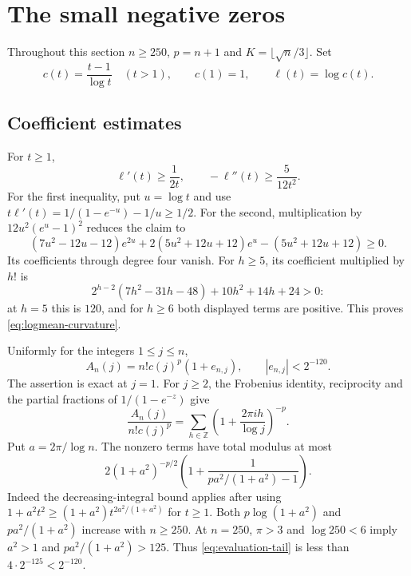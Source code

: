 \section{The small negative zeros}

Throughout this section $n\ge250$, $p=n+1$ and $K=\lfloor\sqrt n/3\rfloor$. Set
\[
c(t)=\frac{t-1}{\log t}\quad(t>1),\qquad c(1)=1,\qquad \ell(t)=\log c(t).
\]

\subsection{Coefficient estimates}
For $t\ge1$,
\begin{equation}\label{eq:logmean-curvature}
\ell'(t)\ge\frac1{2t},\qquad -\ell''(t)\ge\frac5{12t^2}.
\end{equation}
For the first inequality, put $u=\log t$ and use
$t\ell'(t)=1/(1-e^{-u})-1/u\ge1/2$.
For the second, multiplication by $12u^2(e^u-1)^2$ reduces the claim to
\[
(7u^2-12u-12)e^{2u}+2(5u^2+12u+12)e^u-(5u^2+12u+12)\ge0.
\]
Its coefficients through degree four vanish. For $h\ge5$, its coefficient multiplied by $h!$ is
\[
2^{h-2}(7h^2-31h-48)+10h^2+14h+24>0:
\]
at $h=5$ this is $120$, and for $h\ge6$ both displayed terms are positive. This proves \eqref{eq:logmean-curvature}.

Uniformly for the integers $1\le j\le n$,
\begin{equation}\label{eq:eulerian-evaluation}
A_n(j)=n!c(j)^p(1+e_{n,j}),\qquad |e_{n,j}|<2^{-120}.
\end{equation}
The assertion is exact at $j=1$. For $j\ge2$, the Frobenius identity, reciprocity and the partial fractions of $1/(1-e^{-z})$ give
\[
\frac{A_n(j)}{n!c(j)^p}
=\sum_{h\in\mathbb Z}\left(1+\frac{2\pi i h}{\log j}\right)^{-p}.
\]
Put $a=2\pi/\log n$. The nonzero terms have total modulus at most
\begin{equation}\label{eq:evaluation-tail}
2(1+a^2)^{-p/2}
\left(1+\frac1{pa^2/(1+a^2)-1}\right).
\end{equation}
Indeed the decreasing-integral bound applies after using
$1+a^2t^2\ge(1+a^2)t^{2a^2/(1+a^2)}$ for $t\ge1$.
Both $p\log(1+a^2)$ and $pa^2/(1+a^2)$ increase with $n\ge250$.
At $n=250$, $\pi>3$ and $\log250<6$ imply $a^2>1$ and
$pa^2/(1+a^2)>125$. Thus \eqref{eq:evaluation-tail} is less than
$4\cdot2^{-125}<2^{-120}$.

